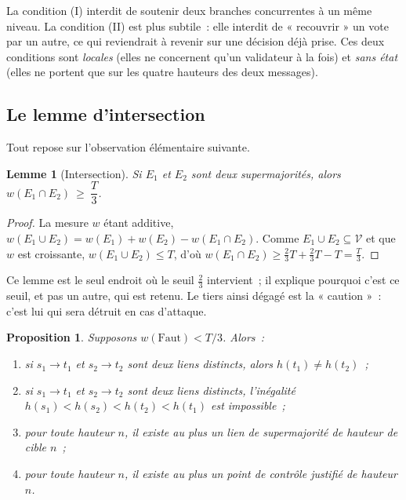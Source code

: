 \documentclass[11pt,a4paper]{article}
\theoremstyle{plain}
\newtheorem{lemme}[theoreme]{Lemme}
\newtheorem{proposition}[theoreme]{Proposition}
\theoremstyle{definition}
\newcommand{\Vv}{\mathcal{V}}
\begin{document}
La condition (I) interdit de soutenir deux branches concurrentes à un même niveau. La
condition (II) est plus subtile~: elle interdit de « recouvrir » un vote par un autre, ce qui
reviendrait à revenir sur une décision déjà prise. Ces deux conditions sont \emph{locales}
(elles ne concernent qu'un validateur à la fois) et \emph{sans état} (elles ne portent que
sur les quatre hauteurs des deux messages).

\subsection{Le lemme d'intersection}

Tout repose sur l'observation élémentaire suivante.

\begin{lemme}[Intersection]\label{lem:inter}
Si $E_1$ et $E_2$ sont deux supermajorités, alors $w(E_1\cap E_2)\ \ge\ \dfrac{T}{3}$.
\end{lemme}

\begin{proof}
La mesure $w$ étant additive, $w(E_1\cup E_2)=w(E_1)+w(E_2)-w(E_1\cap E_2)$. Comme
$E_1\cup E_2\subseteq\Vv$ et que $w$ est croissante, $w(E_1\cup E_2)\le T$, d'où
$w(E_1\cap E_2)\ge \tfrac23 T+\tfrac23 T-T=\tfrac{T}{3}$.
\end{proof}

Ce lemme est le seul endroit où le seuil $\tfrac23$ intervient~; il explique pourquoi c'est
ce seuil, et pas un autre, qui est retenu. Le tiers ainsi dégagé est la « caution »~: c'est
lui qui sera détruit en cas d'attaque.

\begin{proposition}\label{prop:iiv}
Supposons $w(\mathrm{Faut})<T/3$. Alors~:
\begin{enumerate}[label=(\roman*),leftmargin=2.4em,itemsep=1pt]
\item si $s_1\to t_1$ et $s_2\to t_2$ sont deux liens distincts, alors $h(t_1)\ne h(t_2)$~;
\item si $s_1\to t_1$ et $s_2\to t_2$ sont deux liens distincts, l'inégalité
$h(s_1)<h(s_2)<h(t_2)<h(t_1)$ est impossible~;
\item pour toute hauteur $n$, il existe au plus un lien de supermajorité de hauteur de cible
$n$~;
\item pour toute hauteur $n$, il existe au plus un point de contrôle justifié de hauteur $n$.
\end{enumerate}
\end{proposition}
\end{document}
